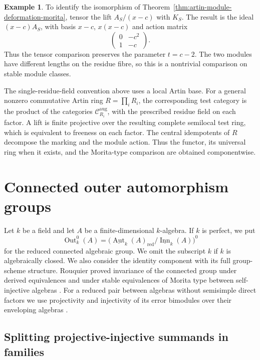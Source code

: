 \documentclass[12pt,a4paper,english,reqno]{amsart}
\numberwithin{equation}{section}
\theoremstyle{plain}
\theoremstyle{definition}
\newtheorem{example}[theorem]{Example}
\begin{document}
\begin{example}
To identify the isomorphism of Theorem~\ref{thm:artin-module-deformation-morita},
tensor the lift $A_S/(x-c)$ with $K_S$. The result is the
ideal $(x-c)A_S$, with basis $x-c$, $x(x-c)$ and action matrix
\[
 \begin{pmatrix}0&-c^2\\[1pt]1&-c\end{pmatrix}.
\]
Thus the tensor comparison preserves the parameter $t=c-2$.
The two modules have different lengths on the residue fibre,
so this is a nontrivial comparison on stable module classes.
\end{example}

\medskip
The single-residue-field convention above uses a local Artin
base. For a general nonzero commutative Artin ring
$R=\prod_iR_i$, the corresponding test category is the product
of the categories $\mathcal C_{R_i}^{\mathrm{aug}}$, with the
prescribed residue field on each factor. A lift is finite
projective over the resulting complete semilocal test ring,
which is equivalent to freeness on each factor. The central
idempotents of $R$ decompose the marking and the module
action. Thus the functor, its universal ring when it exists,
and the Morita-type comparison are obtained componentwise.

\section{Connected outer automorphism groups}
\label{sec:outer-groups}

Let $k$ be a field and let $A$ be a finite-dimensional $k$-algebra.
If $k$ is perfect, we put
\[
 \operatorname{Out}^0_k(A)=
 \bigl(\underline{\operatorname{Aut}}_k(A)_{\mathrm{red}}
       /\underline{\operatorname{Inn}}_k(A)\bigr)^0
\]
for the reduced connected algebraic group. We omit the subscript
$k$ if $k$ is algebraically closed. We also consider the identity
component with its full group-scheme structure. Rouquier proved
invariance of the connected group under derived equivalences and
under stable equivalences of Morita type between self-injective
algebras \cite[Theorems~4.6 and~4.15]{Rouquier2011Automorphisms}.
For a reduced pair between algebras without semisimple direct
factors we use projectivity and injectivity of its error bimodules
over their enveloping algebras
\cite[Lemma~4.1(3)]{CPX2012}.

\subsection{Splitting projective-injective summands in families}
\end{document}
